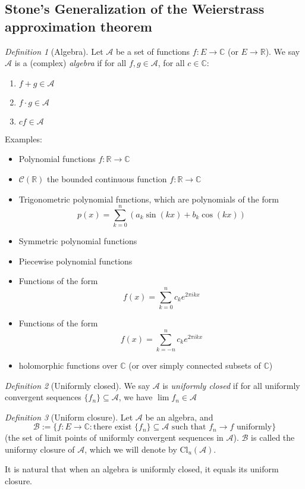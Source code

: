 \documentclass{article}
\theoremstyle{plain}
\theoremstyle{remark}
\newtheorem{definition}{Definition}
\newcommand{\R}{{\mathbb R}}
\newcommand{\C}{{\mathbb C}}
\begin{document}
\subsection{Stone's Generalization of the Weierstrass approximation theorem}
\begin{definition}[Algebra]
	Let $\mathcal{A}$ be a set of functions $f \colon E \to \C$ (or $E \to \R$).
	We say $\mathcal{A}$ is a (complex) \emph{algebra} if for all $f,g \in \mathcal{A}$,
	for all $c \in \C$:
	\begin{enumerate}
		\item $f+g \in \mathcal{A}$
		\item $f \cdot g \in \mathcal{A}$
		\item $cf \in \mathcal{A}$
	\end{enumerate}
\end{definition}
Examples:
\begin{itemize}
	\item Polynomial functions $f \colon \R \to \C$
	\item $\mathcal{C}(\R)$ the bounded continuous function $f \colon \R \to \C$
	\item Trigonometric polynomial functions, which are polynomials of the form
		\[
			p(x) = \sum_{k=0}^n (a_k \sin(kx) + b_k \cos(kx))
		\]
	\item Symmetric polynomial functions
	\item Piecewise polynomial functions
	\item Functions of the form
		\[
			f(x) = \sum_{k=0}^n c_k e^{2 \pi i kx}
		\]
	\item Functions of the form
		\[
			f(x) = \sum_{k=-n}^n c_k e^{2 \pi i kx}
		\]
	\item holomorphic functions over $\C$ (or over simply connected subsets of $\C$)
\end{itemize}

\begin{definition}[Uniformly closed]
	We say $\mathcal{A}$ is \emph{uniformly closed} if
	for all uniformly convergent sequences $\{f_n\} \subseteq \mathcal{A}$,
	we have $\lim f_n \in \mathcal{A}$
\end{definition}
\begin{definition}[Uniform closure]
	Let $\mathcal{A}$ be an algebra, and
	\[
		\mathcal{B} := \{f \colon E \to \C \colon
			\text{there exist }\{f_n\} \subseteq \mathcal{A}
		\text{ such that } f_n \to f \text{ uniformly}\}
	\]
	(the set of limit points of uniformly convergent sequences in $\mathcal{A}$).
	$\mathcal{B}$ is called the uniformy closure of $\mathcal{A}$,
	which we will denote by $\mathrm{Cl}_u(\mathcal{A})$.
\end{definition}
It is natural that when an algebra is uniformly closed, it equals its uniform closure.
\end{document}

